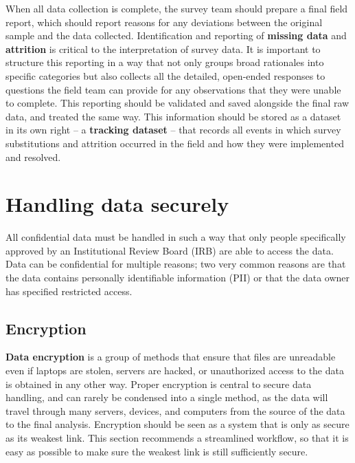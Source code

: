 When all data collection is complete,
the survey team should prepare a final field report,
which should report reasons for any deviations between the original sample and the data collected.
Identification and reporting of \textbf{missing data} and \textbf{attrition}
is critical to the interpretation of survey data.
It is important to structure this reporting in a way that not only
groups broad rationales into specific categories
but also collects all the detailed, open-ended responses
to questions the field team can provide for any observations that they were unable to complete.
This reporting should be validated and saved alongside the final raw data, and treated the same way.
This information should be stored as a dataset in its own right
-- a \textbf{tracking dataset} -- that records all events in which survey substitutions
and attrition occurred in the field and how they were implemented and resolved.


\section{Handling data securely}

All confidential data must be handled in such a way that only people specifically
approved by an Institutional Review Board (IRB)
are able to access the data.
Data can be confidential for multiple reasons; two 
very common reasons are that the data contains personally identifiable information (PII)
or that the data owner has specified restricted access.


\subsection{Encryption}

\textbf{Data encryption} is a group of methods that ensure that files are unreadable
even if laptops are stolen, servers are hacked,
or unauthorized access to the data is obtained in any other way.
Proper encryption is central to secure data handling, and can rarely be condensed into a single method,
as the data will travel through many servers, devices, and computers
from the source of the data to the final analysis.
Encryption should be seen as a system
that is only as secure as its weakest link.
This section recommends a streamlined workflow,
so that it is easy as possible to make sure
the weakest link is still sufficiently secure.

